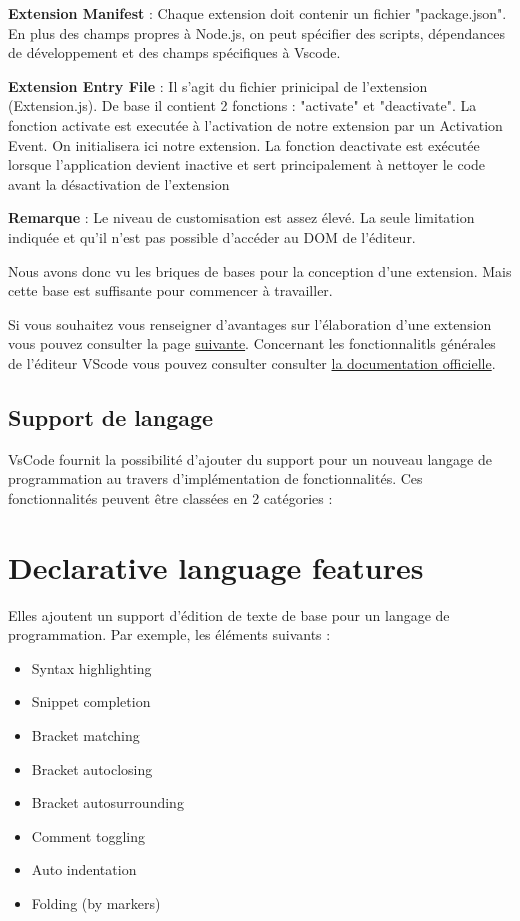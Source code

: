 \documentclass[
    iict, %
    il, %
]{heig-tb}
\begin{document}
\textbf{Extension Manifest} :
Chaque extension doit contenir un fichier "package.json". En plus des champs propres à Node.js, on peut spécifier des scripts, dépendances de développement et des champs spécifiques à Vscode.

\textbf{Extension Entry File} :
Il s'agit du fichier prinicipal de l'extension (Extension.js).
De base il contient 2 fonctions : "activate" et "deactivate".
La fonction activate est executée à l'activation de notre extension par un Activation Event. On initialisera ici notre extension.
La fonction deactivate est exécutée lorsque l'application devient inactive et sert principalement à nettoyer le code avant la désactivation de l'extension

\textbf{Remarque} : Le niveau de customisation est assez élevé. La seule limitation indiquée et qu'il n'est pas possible d'accéder au DOM de l'éditeur.

Nous avons donc vu les briques de bases pour la conception d'une extension. Mais cette base est suffisante pour commencer à travailler.

Si vous souhaitez vous renseigner d'avantages sur l'élaboration d'une extension vous pouvez consulter la page \href{https://code.visualstudio.com/api}{suivante}.
Concernant les fonctionnalitls générales de l'éditeur VScode vous pouvez consulter consulter \href{https://code.visualstudio.com/docs}{la documentation officielle}.

\subsection{Support de langage}
VsCode fournit la possibilité d'ajouter du support pour un nouveau langage de programmation au travers d'implémentation de fonctionnalités. Ces fonctionnalités peuvent être classées en 2 catégories :

\section{Declarative language features}
Elles ajoutent un support d'édition de texte de base pour un langage de programmation.
Par exemple, les éléments suivants :

\begin{itemize}
    \item Syntax highlighting
    \item Snippet completion
    \item Bracket matching
    \item Bracket autoclosing
    \item Bracket autosurrounding
    \item Comment toggling
    \item Auto indentation
    \item Folding (by markers)
\end{itemize}
\end{document}
